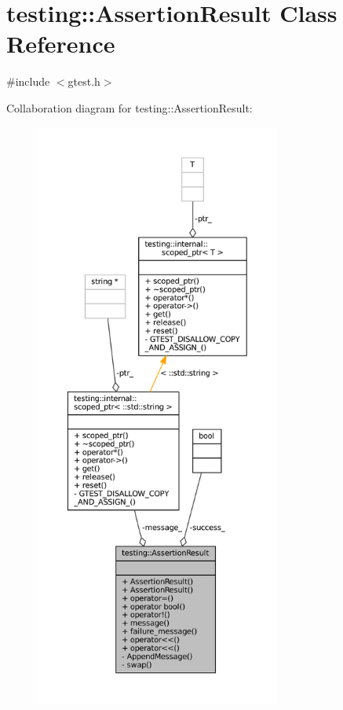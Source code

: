\hypertarget{classtesting_1_1AssertionResult}{}\section{testing\+:\+:Assertion\+Result Class Reference}
\label{classtesting_1_1AssertionResult}


{\ttfamily \#include $<$gtest.\+h$>$}



Collaboration diagram for testing\+:\+:Assertion\+Result\+:
\nopagebreak
\begin{figure}[H]
\begin{center}
\leavevmode
\includegraphics[height=550pt]{classtesting_1_1AssertionResult__coll__graph}
\end{center}
\end{figure}
